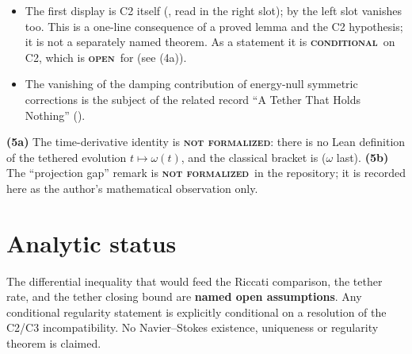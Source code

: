 \documentclass[11pt]{article}
\newcommand{\tagbox}[2]{\textcolor{#1}{\textbf{\textsc{#2}}}}
\newcommand{\COND}{\tagbox{orange!75!black}{conditional}}
\newcommand{\OPEN}{\tagbox{blue!60!black}{open}}
\newcommand{\NF}{\tagbox{gray!80!black}{not formalized}}
\begin{document}
\begin{leanstatus}
\begin{itemize}
\item The first display is C2 itself (, read in the right slot);
by  the left slot vanishes too. This is a one-line consequence of a proved
lemma and the C2 hypothesis; it is not a separately named theorem. As a statement it is
\COND\ on C2, which is \OPEN\ for  (see (4a)).
\item The vanishing of the damping contribution of energy-null symmetric corrections is the subject
of the related record ``A Tether That Holds Nothing'' ().
\end{itemize}
\end{leanstatus}

\begin{leancorr}
\textbf{(5a)} The time-derivative identity is \NF: there is no Lean definition of the tethered
evolution $t\mapsto\omega(t)$, and the classical bracket is 
($\omega$ last). \textbf{(5b)} The ``projection gap'' remark is \NF\ in the repository; it is
recorded here as the author's mathematical observation only.
\end{leancorr}

\section{Analytic status}
\begin{authortext}
The differential inequality that would feed the Riccati comparison, the tether rate, and the
tether closing bound are \textbf{named open assumptions}. Any conditional regularity statement is
explicitly conditional on a resolution of the C2/C3 incompatibility. No Navier–Stokes existence,
uniqueness or regularity theorem is claimed.
\end{authortext}
\end{document}
